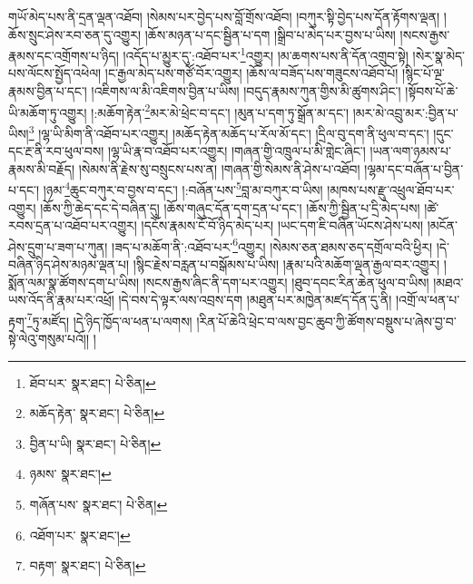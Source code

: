 གཡོ་མེད་པས་ནི་དྲན་ལྡན་འཐོབ། །སེམས་པར་བྱེད་པས་བློ་གྲོས་འཐོབ། །བཀུར་སྟི་བྱེད་པས་དོན་རྟོགས་ལྡན། །ཆོས་སྲུང་ཤེས་རབ་ཅན་དུ་འགྱུར། །ཆོས་མཉན་པ་དང་སྦྱིན་པ་དག །སྒྲིབ་པ་མེད་པར་བྱས་པ་ཡིས། །སངས་རྒྱས་རྣམས་དང་འགྲོགས་པ་ཉིད། །འདོད་པ་མྱུར་དུ་:འཐོབ་པར་\footnote{ཐོབ་པར་  སྣར་ཐང་།  པེ་ཅིན། }འགྱུར། །མ་ཆགས་པས་ནི་དོན་འགྲུབ་སྟེ། །སེར་སྣ་མེད་པས་ལོངས་སྤྱོད་འཕེལ། །ང་རྒྱལ་མེད་པས་གཙོ་བོར་འགྱུར། །ཆོས་ལ་བཟོད་པས་གཟུངས་འཐོབ་པོ། །སྙིང་པོ་ལྔ་རྣམས་བྱིན་པ་དང་། །འཇིགས་ལ་མི་འཇིགས་བྱིན་པ་ཡིས། །བདུད་རྣམས་ཀུན་གྱིས་མི་ཚུགས་ཤིང་། །སྟོབས་པོ་ཆེ་ཡི་མཆོག་ཏུ་འགྱུར། །:མཆོག་རྟེན་\footnote{མཆོད་རྟེན་  སྣར་ཐང་།  པེ་ཅིན། }མར་མེ་ཕྲེང་བ་དང་། །མུན་པ་དག་ཏུ་སྒྲོན་མ་དང་། །མར་མེ་འབྲུ་མར་:བྱིན་པ་ཡིས།\footnote{བྱིན་པ་ཡི།  སྣར་ཐང་།  པེ་ཅིན། } །ལྷ་ཡི་མིག་ནི་འཐོབ་པར་འགྱུར། །མཆོད་རྟེན་མཆོད་པ་རོལ་མོ་དང་། །དྲིལ་བུ་དག་ནི་ཕུལ་བ་དང་། །དུང་དང་རྔ་ནི་རབ་ཕུལ་བས། །ལྷ་ཡི་རྣ་བ་འཐོབ་པར་འགྱུར། །གཞན་གྱི་འཁྲུལ་པ་མི་གླེང་ཞིང་། །ཡན་ལག་ཉམས་པ་རྣམས་མི་བརྗོད། །སེམས་ནི་རྗེས་སུ་བསྲུངས་པས་ན། །གཞན་གྱི་སེམས་ནི་ཤེས་པ་འཐོབ། །ལྷམ་དང་བཞོན་པ་བྱིན་པ་དང་། །ཉམ་\footnote{ཉམས་  སྣར་ཐང་། }ཆུང་བཀུར་བ་བྱས་བ་དང་། །:བཞོན་པས་\footnote{གཞོན་པས་  སྣར་ཐང་།  པེ་ཅིན། }བླ་མ་བཀུར་བ་ཡིས། །མཁས་པས་རྫུ་འཕྲུལ་ཐོབ་པར་འགྱུར། །ཆོས་ཀྱི་ཆེད་དང་དེ་བཞིན་དུ། །ཆོས་གཞུང་དོན་དག་དྲན་པ་དང་། །ཆོས་ཀྱི་སྦྱིན་པ་དྲི་མེད་པས། །ཚེ་རབས་དྲན་པ་འཐོབ་པར་འགྱུར། །དངོས་རྣམས་ངོ་བོ་ཉིད་མེད་པར། །ཡང་དག་ཇི་བཞིན་ཡོངས་ཤེས་པས། །མངོན་ཤེས་དྲུག་པ་ཟག་པ་ཀུན། །ཟད་པ་མཆོག་ནི་:འཐོབ་པར་\footnote{འཐོག་པར་  སྣར་ཐང་། }འགྱུར། །སེམས་ཅན་ཐམས་ཅད་དགྲོལ་བའི་ཕྱིར། །དེ་བཞིན་ཉིད་ཤེས་མཉམ་ལྡན་པ། །སྙིང་རྗེས་བརླན་པ་བསྒོམས་པ་ཡིས། །རྣམ་པའི་མཆོག་ལྡན་རྒྱལ་བར་འགྱུར། །སྨོན་ལམ་སྣ་ཚོགས་དག་པ་ཡིས། །སངས་རྒྱས་ཞིང་ནི་དག་པར་འགྱུར། །ཐུབ་དབང་རིན་ཆེན་ཕུལ་བ་ཡིས། །མཐའ་ཡས་འོད་ནི་རྣམ་པར་འཕྲོ། །དེ་བས་དེ་ལྟར་ལས་འབྲས་དག །མཐུན་པར་མཁྱེན་མཛད་དོན་དུ་ནི། །འགྲོ་ལ་ཕན་པ་རྟག་\footnote{བརྟག་  སྣར་ཐང་།  པེ་ཅིན། }ཏུ་མཛོད། །དེ་ཉིད་ཁྱོད་ལ་ཕན་པ་ལགས། །རིན་པོ་ཆེའི་ཕྲེང་བ་ལས་བྱང་ཆུབ་ཀྱི་ཚོགས་བསྡུས་པ་ཞེས་བྱ་བ་སྟེ་ལེའུ་གསུམ་པའོ།། །
